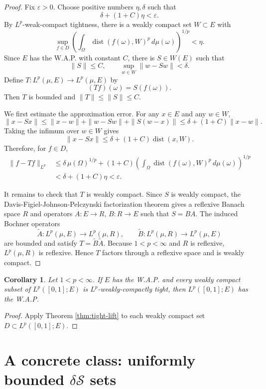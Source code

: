 \documentclass[11pt]{article}
\newtheorem{corollary}{Corollary}
\newcommand{\dist}{\operatorname{dist}}
\newcommand{\eps}{\varepsilon}
\begin{document}
\begin{proof}
Fix \(\eps>0\).  Choose positive numbers \(\eta,\delta\) such that
\[
  \delta+(1+C)\eta<\eps .
\]
By \(L^p\)-weak-compact tightness, there is a weakly compact set \(W\subset E\) with
\[
  \sup_{f\in D}\left(\int_\Omega \dist(f(\omega),W)^p\,d\mu(\omega)\right)^{1/p}<\eta .
\]
Since \(E\) has the W.A.P. with constant \(C\), there is \(S\in W(E)\) such that
\[
  \|S\|\le C,\qquad \sup_{w\in W}\|w-Sw\|<\delta .
\]
Define \(T:L^p(\mu,E)\to L^p(\mu,E)\) by
\[
  (Tf)(\omega)=S(f(\omega)).
\]
Then \(T\) is bounded and \(\|T\|\le \|S\|\le C\).

We first estimate the approximation error.  For any \(x\in E\) and any \(w\in W\),
\[
  \|x-Sx\|
  \le \|x-w\|+\|w-Sw\|+\|S(w-x)\|
  \le \delta+(1+C)\|x-w\|.
\]
Taking the infimum over \(w\in W\) gives
\[
  \|x-Sx\|\le \delta+(1+C)\dist(x,W).
\]
Therefore, for \(f\in D\),
\[
\begin{aligned}
  \|f-Tf\|_{L^p}
  &\le \delta\,\mu(\Omega)^{1/p}
      +(1+C)\left(\int_\Omega \dist(f(\omega),W)^p\,d\mu(\omega)\right)^{1/p} \\
  &< \delta+(1+C)\eta<\eps .
\end{aligned}
\]

It remains to check that \(T\) is weakly compact.  Since \(S\) is weakly compact, the Davis-Figiel-Johnson-Pelczynski factorization theorem gives a reflexive Banach space \(R\) and operators \(A:E\to R\), \(B:R\to E\) such that \(S=BA\).  The induced Bochner operators
\[
  \widetilde A:L^p(\mu,E)\to L^p(\mu,R),\qquad
  \widetilde B:L^p(\mu,R)\to L^p(\mu,E)
\]
are bounded and satisfy \(T=\widetilde B\widetilde A\).  Because \(1<p<\infty\) and \(R\) is reflexive, \(L^p(\mu,R)\) is reflexive.  Hence \(T\) factors through a reflexive space and is weakly compact.
\end{proof}

\begin{corollary}\label{cor:reduction}
Let \(1<p<\infty\).  If \(E\) has the W.A.P. and every weakly compact subset of \(L^p([0,1];E)\) is \(L^p\)-weakly-compactly tight, then \(L^p([0,1];E)\) has the W.A.P.
\end{corollary}

\begin{proof}
Apply Theorem \ref{thm:tight-lift} to each weakly compact set \(D\subset L^p([0,1];E)\).
\end{proof}

\section{A concrete class: uniformly bounded \texorpdfstring{\(\delta\mathcal S\)}{delta-S} sets}
\end{document}

